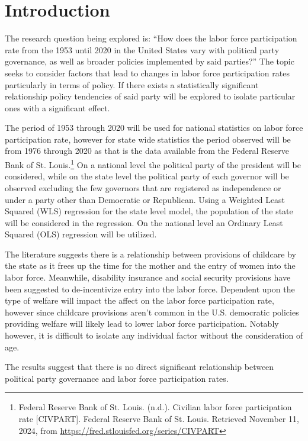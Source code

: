 \chapter{Introduction}

The research question being explored is: ``How does the labor force participation rate from the 1953 until 2020 in the United States vary with political party governance, as well as broader policies implemented by said parties?'' The topic seeks to consider factors that lead to changes in labor force participation rates particularly in terms of policy. If there exists a statistically significant relationship policy tendencies of said party will be explored to isolate particular ones with a significant effect.

The period of 1953 through 2020 will be used for national statistics on labor force participation rate, however for state wide statistics the period observed will be from 1976 through 2020 as that is the data available from the Federal Reserve Bank of St. Louis.\footnote{Federal Reserve Bank of St. Louis. (n.d.). Civilian labor force participation rate [CIVPART]. Federal Reserve Bank of St. Louis. Retrieved November 11, 2024, from \href{https://fred.stlouisfed.org/series/CIVPART}{https://fred.stlouisfed.org/series/CIVPART}} On a national level the political party of the president will be considered, while on the state level the political party of each governor will be observed excluding the few governors that are registered as independence or under a party other than Democratic or Republican. Using a Weighted Least Squared (WLS) regression for the state level model, the population of the state will be considered in the regression. On the national level an Ordinary Least Squared (OLS) regression will be utilized.

The literature suggests  there is a relationship between provisions of childcare by the state as it frees up the time for the mother and the entry of women into the labor force. Meanwhile, disability insurance and social security provisions have been suggested to de-incentivize entry into the labor force. Dependent upon the type of welfare will impact the affect on the labor force participation rate, however since childcare provisions aren't common in the U.S. democratic policies providing welfare will likely lead to lower labor force participation. Notably however, it is difficult to isolate any individual factor without the consideration of age.

The results suggest that there is no direct significant relationship between political party governance and labor force participation rates.